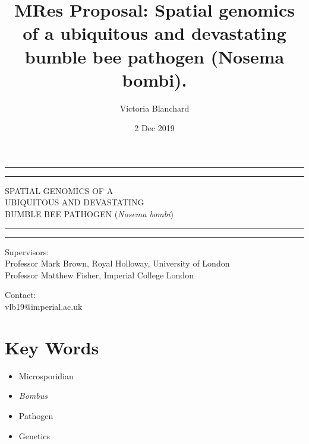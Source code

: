 \documentclass[11pt]{article}
\title {MRes Proposal: Spatial genomics of a ubiquitous and devastating bumble bee pathogen (Nosema bombi).}
\author{Victoria Blanchard}
\date{2 Dec 2019}
\begin{document}
\begin{titlepage}


	\centering %
		
	
	
	
	\vspace*{5\baselineskip}
	
	\rule{\textwidth}{1.6pt}\vspace*{-\baselineskip}\vspace*{2pt} %
	\rule{\textwidth}{0.4pt} %
	
	\vspace{0.75\baselineskip} %
	
	{\LARGE SPATIAL GENOMICS OF A \\ UBIQUITOUS AND DEVASTATING \\ BUMBLE BEE PATHOGEN (\textit{Nosema bombi})\\} 
	
	\vspace{0.75\baselineskip} %
	
	\rule{\textwidth}{0.4pt}\vspace*{-\baselineskip}\vspace{3.2pt} 
	\rule{\textwidth}{1.6pt} 
	
	\vspace{2\baselineskip} 
	
	
	Supervisors: \\
		Professor Mark Brown, Royal Holloway, University of London \\
		Professor  Matthew Fisher, Imperial College London 

		
	\vspace{1.5 \baselineskip} %
	
	Contact: \\
	vlb19@imperial.ac.uk
	


\end{titlepage}

\linenumbers

	\section{Key Words}
	\begin{itemize}
	
	\item Microsporidian
	\item \textit{Bombus}
	\item Pathogen
	\item Genetics
	
	\end{itemize}
	
\end{document}
